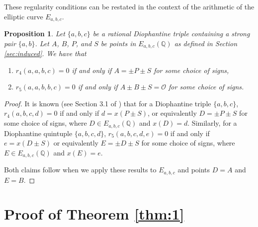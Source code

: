 \documentclass[a4paper]{amsart}
\theoremstyle{plain}
\newtheorem{proposition}[theorem]{Proposition}
\def\Q{\mathbb{Q}}
\theoremstyle{definition}
\begin{document}
These regularity conditions can be restated in the context of the arithmetic of the elliptic curve $E_{a,b,c}$.

\begin{proposition}\label{prop:regularity}
	Let $\{a,b,c\}$ be a rational Diophantine triple containing a strong pair $\{a,b\}$. Let $A$, $B$, $P$, and $S$ be points in $E_{a,b,c}(\Q)$ as defined in Section \ref{sec:induced}.
	We have that
	\begin{enumerate}
		\item [a)] $r_4(a,a,b,c)=0$ if and only if $A= \pm P \pm S$ for some choice of signs,
		\item [b)] $r_5(a,a,b,b,c)=0$ if and only if $A\pm B \pm S=\mathcal{O}$ for some choice of signs.
	\end{enumerate}
\end{proposition}
\begin{proof}
It is known (see Section 3.1 of \cite{duje-book}) that for a Diophantine triple $\{a,b,c\}$, $r_4(a,b,c,d)=0$ if and only if $d=x(P\pm S)$, or equivalently $D=\pm P \pm S$ for some choice of signs, where $D\in E_{a,b,c}(\Q)$ and $x(D)=d$. Similarly, for a Diophantine quintuple $\{a,b,c,d\}$, $r_5(a,b,c,d,e)=0$ if and only if $e=x(D \pm S)$ or equivalently $E=\pm D \pm S$ for some choice of signs, where $E\in E_{a,b,c}(\Q)$ and $x(E)=e$.

Both claims follow when we apply these results to $E_{a,b,c}$ and points $D=A$ and $E=B$.

\end{proof}

\section{Proof of Theorem \ref{thm:1}}
\end{document}
